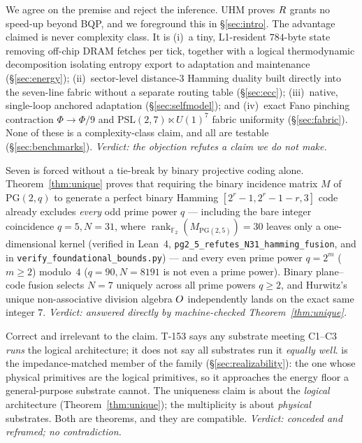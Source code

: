 \begin{redteambox}
We agree on the premise and reject the inference. UHM proves $R$ grants
no speed-up beyond BQP, and we foreground this in \S\ref{sec:intro}. The
advantage claimed is never complexity class. It is (i)~a tiny, L1-resident
$784$-byte state removing off-chip DRAM fetches per tick, together with a
logical thermodynamic decomposition isolating entropy export to adaptation and
maintenance (\S\ref{sec:energy}); (ii)~sector-level distance-$3$ Hamming
duality built directly into the seven-line fabric without a separate routing
table (\S\ref{sec:ecc}); (iii)~native, single-loop anchored adaptation
(\S\ref{sec:selfmodel}); and (iv)~exact Fano pinching contraction
$\Phi\to\Phi/9$ and $\mathrm{PSL}(2,7)\ltimes U(1)^7$ fabric uniformity
(\S\ref{sec:fabric}). None of these is a complexity-class claim, and all are
testable (\S\ref{sec:benchmarks}). \emph{Verdict: the objection refutes a
claim we do not make.}
\end{redteambox}

\begin{redteambox}
Seven is forced without a tie-break by binary projective coding alone.
Theorem~\ref{thm:unique} proves that requiring the binary incidence matrix $M$
of $\mathrm{PG}(2,q)$ to generate a perfect binary Hamming $[2^r{-}1,2^r{-}1{-}r,3]$
code already excludes \emph{every} odd prime power $q$ --- including the bare
integer coincidence $q=5, N=31$, where
$\operatorname{rank}_{\mathbb{F}_2}(M_{\mathrm{PG}(2,5)})=30$ leaves only a
one-dimensional kernel (verified in Lean~4,
\texttt{pg2\_5\_refutes\_N31\_hamming\_fusion}, and in
\texttt{verify\_foundational\_bounds.py}) --- and every even prime power
$q=2^m$ ($m\ge 2$) modulo~$4$ ($q=90, N=8191$ is not even a prime power).
Binary plane--code fusion selects $N=7$ uniquely across all prime powers
$q\ge 2$, and Hurwitz's unique non-associative division algebra $O$
independently lands on the exact same integer $7$. \emph{Verdict: answered
directly by machine-checked Theorem~\ref{thm:unique}.}
\end{redteambox}

\begin{redteambox}
Correct and irrelevant to the claim. T-153 says any substrate meeting
C1--C3 \emph{runs} the logical architecture; it does not say all substrates
run it \emph{equally well}. \TALOS{} is the impedance-matched member of the
family (\S\ref{sec:realizability}): the one whose physical primitives are the
logical primitives, so it approaches the energy floor a general-purpose
substrate cannot. The uniqueness claim is about the \emph{logical}
architecture (Theorem~\ref{thm:unique}); the multiplicity is about
\emph{physical} substrates. Both are theorems, and they are compatible.
\emph{Verdict: conceded and reframed; no contradiction.}
\end{redteambox}


